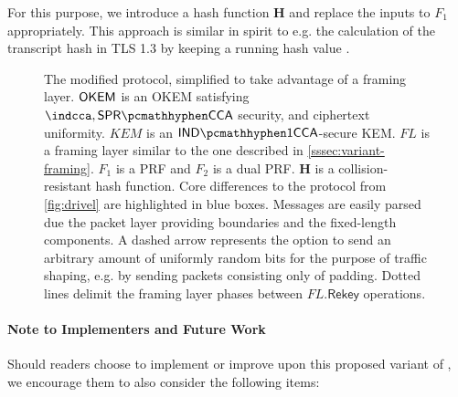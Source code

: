 For this purpose, we introduce a hash function $\mathbf{H}$ and replace the inputs to $F_1$ appropriately. This approach is similar in spirit to e.g. the calculation of the transcript hash in TLS 1.3 by keeping a running hash value \cite[Section~4.4.1]{rfc8446}.

\begin{figure}
    
    \caption[
        The modified \drivel{} protocol, simplified to take advantage of a framing layer.
    ]{
        The modified \drivel{} protocol, simplified to take advantage of a framing layer.
        $\mathsf{OKEM}$ is an OKEM satisfying $\indcca, \sprcca$ security, and ciphertext uniformity.
        $KEM$ is an $\indonecca$-secure KEM.
        $FL$ is a framing layer similar to the one described in \cref{sssec:variant-framing}.
        $F_1$ is a PRF and $F_2$ is a dual PRF.
        $\mathbf{H}$ is a collision-resistant hash function.
        Core differences to the \drivel{} protocol from \cref{fig:drivel} are highlighted in blue boxes.
        Messages are easily parsed due the packet layer providing boundaries and the fixed-length components.
        A dashed arrow represents the option to send an arbitrary amount of uniformly random bits for the purpose of traffic shaping, e.g. by sending packets consisting only of padding.
        Dotted lines delimit the framing layer phases between $FL.\mathsf{Rekey}$ operations.
    }
    \label{fig:modified-drivel-framing}
\end{figure}

\paragraph{Note to Implementers and Future Work}

Should readers choose to implement or improve upon this proposed variant of \drivel{}, we encourage them to also consider the following items:

